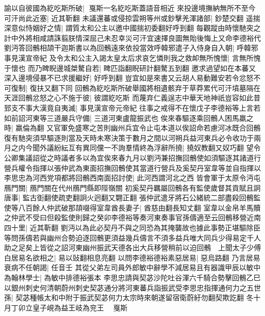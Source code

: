 諭以自彼國為紇吃斯所破|{
	戛斯一名紇吃斯蓋語音相近}
來投邊境撫納無所不至今可汗尚此近塞|{
	近其靳翻}
未議還蕃或侵掠雲朔等州或鈔擊羌渾諸部|{
	鈔楚交翻}
遥揣深意似恃姻好之情|{
	謂質太和公主以邀中國揣初委翻好呼到翻}
每觀蹤由時懷馳突之計中外將相咸請誅翦朕情深屈己未忍幸災可汗宜速擇良圖無貽後悔上又命李德裕代劉沔答回鶻相頡干迦斯書以為回鶻遠來依投當效呼韓邪遣子入侍身自入朝|{
	呼韓邪事見漢宣帝紀}
及令太和公主入謁太皇太后求哀乞憐則我之救卹無所愧懷|{
	言無所愧于懷也}
而乃睥睨邊城桀驁自若|{
	睥匹詣翻睨研計翻驁五到翻}
邀求過望如在本蕃又深入邊境侵暴不已求援繼好|{
	好呼到翻}
豈宜如是來書又云胡人易動難安若令忿怒不可復制|{
	復扶又翻下同}
回鶻為紇吃斯所破舉國將相遺骸弃于草莽累代可汗墳墓隔在天涯回鶻忿怒之心不施于彼|{
	彼謂紇吃斯}
而蔑弃仁義逞志中華天地神祇豈容如此昔郅支不事大漢竟自夷滅|{
	事見漢宣帝元帝紀}
往事之戒得不在懷戊子李德裕等上言若如前詔河東等三道嚴兵守備|{
	三道河東盧龍振武也}
俟來春驅逐乘回鶻人困馬羸之時|{
	羸倫為翻}
又官軍免盛寒之苦則幽州兵宜令止屯本道以俟詔命若慮河冰既合回鶻復有馳突須早驅逐則當及天時未寒決策于數月之間以河朔兵益河東兵必令收功于兩月之内今聞外議紛紜互有異同儻一不詢羣情終為浮辭所撓|{
	撓奴教翻又奴巧翻}
望令公卿集議詔從之時議者多以為宜俟來春九月以劉沔兼招撫回鶻使如須驅逐其諸道行營兵權令指揮以張仲武為東面招撫回鶻使其當道行營兵及奚契丹室韋等並自指揮以李思忠為河西党項都將回鶻西南面招討使|{
	此河西謂河北之西}
皆會軍于太原令沔屯鴈門關|{
	鴈門關在代州鴈門縣即陘嶺關}
初奚契丹羈屬回鶻各有監使歲督其貢賦且詗唐事|{
	監古衘翻使疏吏翻詗火迥翻又翾正翻}
張仲武遣牙將石公緒統二部盡殺回鶻監使等八百餘人仲武破那頡啜得室韋酋長妻子|{
	酋慈由翻長知丈翻}
室韋以金帛羊馬贖之仲武不受曰但殺監使則歸之癸卯李德裕等奏河東奏事官孫儔適至云回鶻移營近南四十里|{
	近其靳翻}
劉沔以為此必契丹不與之同恐為其掩襲故也據此事勢正堪驅除臣等問孫儔若與幽州合勢迫逐回鶻更須益幾兵儔言不須多益兵唯大同兵少得易定千人助之足矣上皆從之詔河東幽州振武天德各出大兵移營稍前以迫回鶻　上聞太子少傅白居易名欲相之|{
	易以䜴翻相息亮翻}
以問李德裕德裕素惡居易|{
	惡烏路翻}
乃言居易衰病不任朝謁|{
	任音壬}
其從父弟左司員外郎敏中辭學不減居易且有器識甲辰以敏中為翰林學士|{
	為敏中排德裕張本}
李思忠請與契苾沙陀吐谷渾六千騎合勢擊回鶻乙巳以銀州刺史何清朝蔚州刺史契苾通分將河東蕃兵詣振武受李思忠指揮通何力之五世孫|{
	契苾種帳太和中附于振武契苾何力太宗時來朝遂留宿衛蔚紆勿翻契欺訖翻}
冬十月丁卯立皇子峴為益王岐為兖王　戛斯

